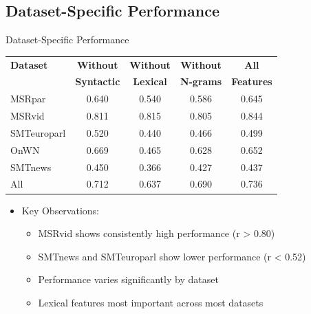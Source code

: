 \documentclass{beamer}
\begin{document}
\subsection{Dataset-Specific Performance}
\begin{frame}{Dataset-Specific Performance}
    \begin{center}
        \begin{tabular}{|l|c|c|c|c|}
            \hline
            \textbf{Dataset} & \textbf{Without} & \textbf{Without} & \textbf{Without} & \textbf{All} \\
            & \textbf{Syntactic} & \textbf{Lexical} & \textbf{N-grams} & \textbf{Features} \\
            \hline
            MSRpar & 0.640 & 0.540 & 0.586 & 0.645 \\
            MSRvid & 0.811 & 0.815 & 0.805 & 0.844 \\
            SMTeuroparl & 0.520 & 0.440 & 0.466 & 0.499 \\
            OnWN & 0.669 & 0.465 & 0.628 & 0.652 \\
            SMTnews & 0.450 & 0.366 & 0.427 & 0.437 \\
            \hline
            All & 0.712 & 0.637 & 0.690 & 0.736 \\
            \hline
        \end{tabular}
    \end{center}
    \begin{itemize}
        \item Key Observations:
        \begin{itemize}
            \item MSRvid shows consistently high performance (r \textgreater{} 0.80)
            \item SMTnews and SMTeuroparl show lower performance (r \textless{} 0.52)
            \item Performance varies significantly by dataset
            \item Lexical features most important across most datasets
        \end{itemize}
    \end{itemize}
\end{frame}

\end{document}
